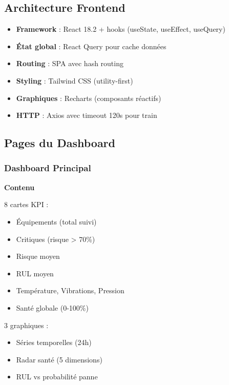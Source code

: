 \documentclass[12pt,a4paper,french]{article}
\begin{document}
\subsection{Architecture Frontend}

\begin{itemize}
    \item \textbf{Framework} : React 18.2 + hooks (useState, useEffect, useQuery)
    \item \textbf{État global} : React Query pour cache données
    \item \textbf{Routing} : SPA avec hash routing
    \item \textbf{Styling} : Tailwind CSS (utility-first)
    \item \textbf{Graphiques} : Recharts (composants réactifs)
    \item \textbf{HTTP} : Axios avec timeout 120s pour train
\end{itemize}

\subsection{Pages du Dashboard}

\subsubsection{Dashboard Principal}

\begin{center}
\textbf{Contenu}
\end{center}

8 cartes KPI :
\begin{itemize}
    \item Équipements (total suivi)
    \item Critiques (risque > 70\%)
    \item Risque moyen
    \item RUL moyen
    \item Température, Vibrations, Pression
    \item Santé globale (0-100\%)
\end{itemize}

3 graphiques :
\begin{itemize}
    \item Séries temporelles (24h)
    \item Radar santé (5 dimensions)
    \item RUL vs probabilité panne
\end{itemize}
\end{document}
